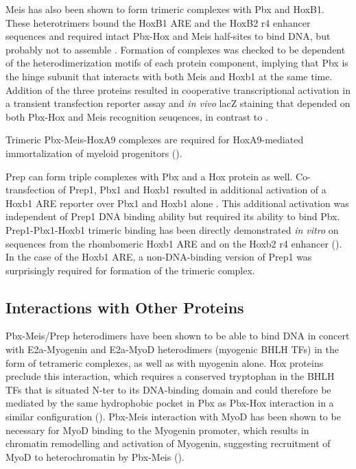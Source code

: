 Meis has also been shown to form trimeric complexes with Pbx and HoxB1. These heterotrimers bound the HoxB1 ARE and the HoxB2 r4 enhancer sequences and required intact Pbx-Hox and Meis half-sites to bind DNA, but probably not to assemble \parencite{Jacobs1999}. Formation of complexes was checked to be dependent of the heterodimerization motifs of each protein component, implying that Pbx is the hinge subunit that interacts with both Meis and Hoxb1 at the same time. Addition of the three proteins resulted in cooperative transcriptional activation in a transient transfection reporter assay and \textit{in vivo} lacZ staining that depended on both Pbx-Hox and Meis recognition seuqences, in contrast to \textcite{Shen1999}. 

Trimeric Pbx-Meis-HoxA9 complexes are required for HoxA9-mediated immortalization of myeloid progenitors (\cite{Schnabel2000}).


Prep can form triple complexes with Pbx and a Hox protein as well. Co-transfection of Prep1, Pbx1 and Hoxb1 resulted in additional activation of a Hoxb1 \ac{ARE} reporter over Pbx1 and Hoxb1 alone \parencite{Berthelsen1998}. This additional activation was independent of Prep1 DNA binding ability but required its ability to bind Pbx. Prep1-Pbx1-Hoxb1 trimeric binding has been directly demonstrated \textit{in vitro} on sequences from the rhombomeric Hoxb1 \ac{ARE} and on the Hoxb2 r4 enhancer (\cite{Ferretti2000}). In the case of the Hoxb1 \ac{ARE}, a non-DNA-binding version of Prep1 was surprisingly required for formation of the trimeric complex. %

\subsection{Interactions with Other Proteins}

Pbx-Meis/Prep heterodimers have been shown to be able to bind DNA in concert with E2a-Myogenin and E2a-MyoD heterodimers (myogenic \ac{BHLH} \acp{TF}) in the form of tetrameric complexes, as well as with myogenin alone. Hox proteins preclude this interaction, which requires a conserved tryptophan in the \ac{BHLH} \acp{TF} that is situated \ac{N-ter} to its DNA-binding domain and could therefore be mediated by the same hydrophobic pocket in Pbx as Pbx-Hox interaction in a similar configuration (\cite{Knoepfler1999}). Pbx-Meis interaction with MyoD has been shown to be necessary for MyoD binding to the Myogenin promoter, which results in chromatin remodelling and activation of Myogenin, suggesting recruitment of MyoD to heterochromatin by Pbx-Meis (\cite{Berkes2004}).


